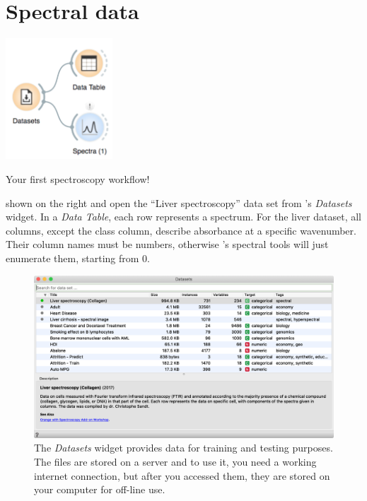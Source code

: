 \chapter{Spectral data}
\label{ch:spectral-data}

\begin{marginfigure}
  \includegraphics[width=40mm]{graphics/ch-spectral_data/spectral-data-fig1.png}%
  \caption{Your first spectroscopy workflow!}
  \label{fig:spectral-data-fig1}
\end{marginfigure}

 shown on the right and open the “Liver spectroscopy” data set from \mutation’s \textit{Datasets} widget.
In a \textit{Data Table}, each row represents a spectrum. For the liver dataset, all columns, except the class column, describe absorbance at a specific wavenumber. Their column names must be numbers, otherwise \mutation’s spectral tools will just enumerate them, starting from 0.

\begin{figure}[h]
  \centering
  \includegraphics[width=\linewidth]{graphics/ch-spectral_data/spectral-data-fig2.png}%
  \caption{The \textit{Datasets} widget provides data for training and testing purposes. The files are stored on a server and to use it, you need a working internet connection, but after you accessed them, they are stored on your computer for off-line use.}
  \label{fig:spectral-data-fig2}
\end{figure}

